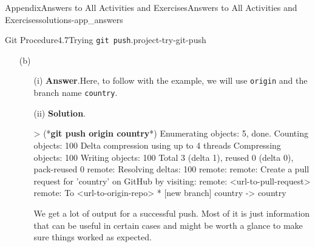 \documentclass[twoside,10pt,]{book}
\newcommand{\blocktitlefont}{\relax}
\newcommand{\mono}[1]{\texttt{#1}}
\newcommand{\consoleinput}[1]{\textbf{#1}}
\begin{document}
\begin{solutions-chapter}{Appendix}{Answers to All Activities and Exercises}{}{Answers to All Activities and Exercises}{}{}{solutions-app_answers}
\begin{projectsolution}{Git Procedure}{4.7}{Trying \mono{git push}.}{project-try-git-push}
\begin{enumerate}[font=\bfseries,label=(\alph*),ref=\alph*]
\begin{enumerate}[font=\bfseries,label=(\roman*),ref=\theenumi.\roman*]
\begin{console}{0}{1}{0}
    git push --set-upstream origin country
\end{console}
Well, look at that, the same error. This should make sense. You are telling Git to push changes to the origin repo but \mono{country}, the current branch, doesn't have an origin since we created the branch locally.%
\item[(iii)]\noindent\textbf{\blocktitlefont Solution}.\hypertarget{solution-try-git-push-c-d-b-back}{}\quad{}\begin{console}{0}{1}{0}
> (*\consoleinput{git push country}*)
fatal: 'country' does not appear to be a git repository
fatal: Could not read from remote repository.

Please make sure you have the correct access rights
and the repository exists.
\end{console}
Remember the four parts to \mono{git push}? Well since we forgot Step 3, the remote name, Git assumes that the word ``country'' is the name of the repo we want to push to. Since there is no repo named ``country'' on your computer nor on GitHub, it doens't know where to push and errors out.%
\end{enumerate}%
\item[(b)]\begin{enumerate}[font=\bfseries,label=(\roman*),ref=\theenumi.\roman*]%
\item[(i)]\noindent\textbf{\blocktitlefont Answer}.\hypertarget{answer-try-git-push-d-b-b-back}{}\quad{}Here, to follow with the example, we will use \mono{origin} and the branch name \mono{country}.%
\item[(ii)]\noindent\textbf{\blocktitlefont Solution}.\hypertarget{solution-try-git-push-d-c-b-back}{}\quad{}\begin{console}{0}{1}{0}
> (*\consoleinput{git push origin country}*)
Enumerating objects: 5, done.
Counting objects: 100%
Delta compression using up to 4 threads
Compressing objects: 100%
Writing objects: 100%
Total 3 (delta 1), reused 0 (delta 0), pack-reused 0
remote: Resolving deltas: 100%
remote: 
remote: Create a pull request for 'country' on GitHub by visiting:
remote:      <url-to-pull-request>
remote: 
To <url-to-origin-repo>
 * [new branch]      country -> country
\end{console}
We get a lot of output for a successful push. Most of it is just information that can be useful in certain cases and might be worth a glance to make sure things worked as expected.%

\end{enumerate}
\end{enumerate}
\end{projectsolution}
\end{solutions-chapter}
\end{document}
